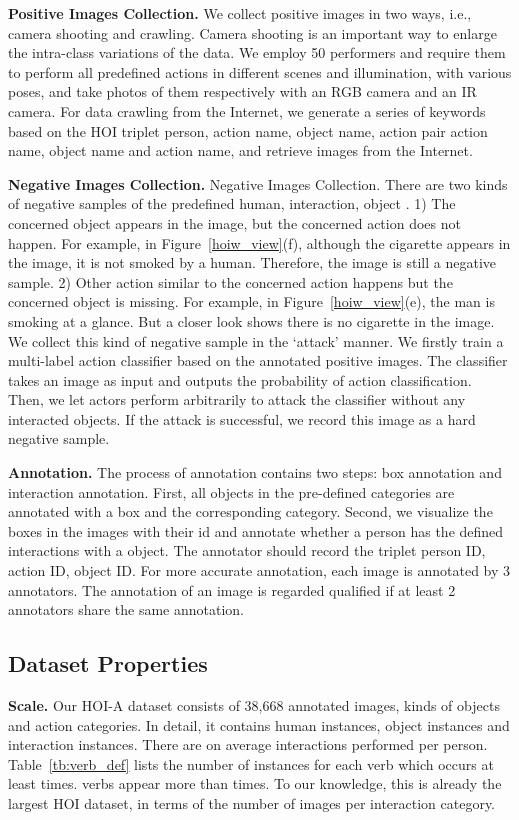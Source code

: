 \documentclass[10pt,twocolumn,letterpaper]{article}
\begin{document}
\noindent
\textbf{Positive Images Collection.}
We collect positive images in two ways, i.e.,  camera shooting and crawling. Camera shooting is an important way to enlarge the intra-class variations of the data. We employ 50 performers and require them to perform all predefined actions in different scenes and illumination, with various poses, and take photos of them respectively with an RGB camera and an IR camera. 
For data crawling from the Internet, we generate a series of keywords based on the HOI triplet  person, action name, object name, action pair action name, object name and action name, and retrieve images from the Internet.


\noindent
\textbf{Negative Images Collection.}
Negative Images Collection. There are two kinds of negative samples of the predefined  human,
interaction, object . 
1) The concerned object appears in the image, but the concerned action does not happen. For example, in Figure~\ref{hoiw_view}(f), although the cigarette appears in the image, it is not smoked by a human. Therefore, the image is still a negative sample.
2) Other action similar to the concerned action happens but the concerned object is missing. For example, in Figure~\ref{hoiw_view}(e), the man is smoking at a glance. But a closer look shows there is no cigarette in the image. 
We collect this kind of negative sample in the `attack’ manner. We firstly train a multi-label action classifier based on the annotated positive images. The classifier takes an image as input and outputs the probability of action classification. Then, we let actors perform arbitrarily to attack the classifier without any interacted objects. If the attack is successful, we record this image as a hard negative sample.


\noindent\textbf{Annotation.}
The process of annotation contains two steps: box annotation and interaction annotation. First, all objects in the pre-defined categories are annotated with a box and the corresponding category.
Second, we visualize the boxes in the images with their id and annotate whether a person has the defined interactions with a object. 
The annotator should record the triplet person ID, action ID, object ID. For more accurate annotation, each image is annotated by 3 annotators. The annotation of an image is regarded qualified if at least 2 annotators share the same annotation.  


\vspace{-1mm}
\subsection{Dataset Properties}
\vspace{-1mm}
\noindent\textbf{Scale.} 
Our HOI-A dataset consists of 38,668 annotated images,  kinds of objects and  action categories. 
In detail, it contains  human instances,  object instances and  interaction instances. 
There are on average  interactions performed per person.  Table~\ref{tb:verb_def} lists the number of instances for each verb which occurs at least  times.   verbs appear more than  times. 
To our knowledge, this is already the largest HOI dataset, in terms of the number of images per interaction category. 
\end{document}
